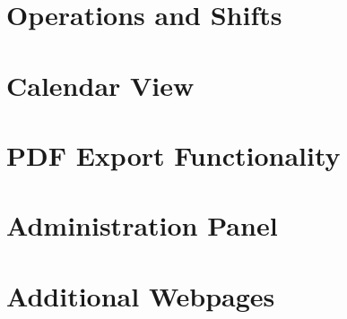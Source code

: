 \section{Operations and Shifts}

\section{Calendar View}

\section{PDF Export Functionality}

\section{Administration Panel}

\section{Additional Webpages}